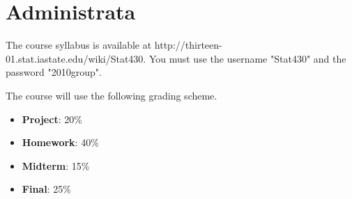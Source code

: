 \documentclass[10pt]{article}
\newenvironment{mitemize}
{
  \begin{itemize}
  \setlength{\itemsep}{1pt}
  \setlength{\parskip}{0pt}
  \setlength{\parsep}{0pt}}{\end{itemize}
}
\begin{document}
\section*{Administrata}
The course syllabus is available at http://thirteen-01.stat.iastate.edu/wiki/Stat430. You must use the username "Stat430" and the password "2010group".

The course will use the following grading scheme.
\begin{mitemize}
\item \textbf{Project}: 20\%
\item \textbf{Homework}: 40\%
\item \textbf{Midterm}: 15\%
\item \textbf{Final}: 25\%
\end{mitemize}
\end{document}

